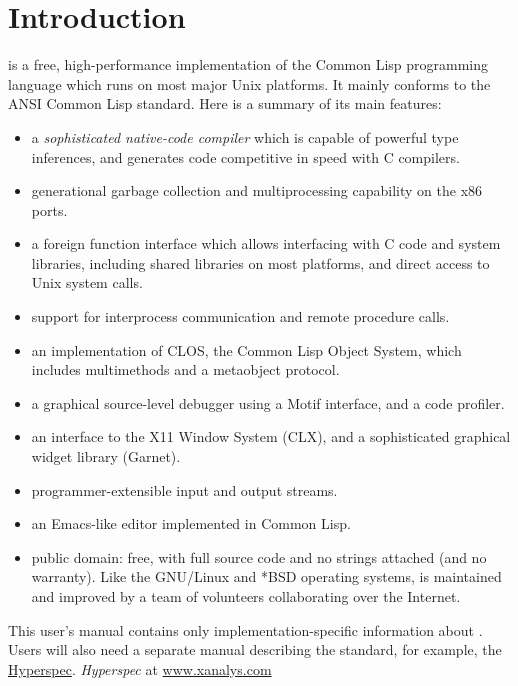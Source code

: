 \chapter{Introduction}

\cmucl{} is a free, high-performance implementation of the Common Lisp
programming language which runs on most major Unix platforms. It
mainly conforms to the ANSI Common Lisp standard. Here is a summary of
its main features:

\begin{itemize}
\item a {\em sophisticated native-code compiler} which is capable of
powerful type inferences, and generates code competitive in speed with
C compilers.

\item generational garbage collection and multiprocessing
capability on the x86 ports.

\item a foreign function interface which allows interfacing with C code and
system libraries, including shared libraries on most platforms, and
direct access to Unix system calls.

\item support for interprocess communication and remote procedure
calls.
     
\item an implementation of CLOS, the Common Lisp Object System, which
includes multimethods and a metaobject protocol.

\item a graphical source-level debugger using a Motif interface, and a
code profiler.

\item an interface to the X11 Window System (CLX), and a sophisticated
graphical widget library (Garnet).

\item programmer-extensible input and output streams.
                        
\item an Emacs-like editor implemented in Common Lisp.

\item public domain: free, with full source code and no
strings attached (and no warranty). Like the GNU/Linux and *BSD
operating systems, \cmucl{} is maintained and improved by a team of
volunteers collaborating over the Internet.
\end{itemize}


This user's manual contains only implementation-specific information
about \cmucl. Users will also need a separate manual describing the
\clisp{} standard, for example, the
\ifpdf
\href{http://www.xanalys.com/software_tools/reference/HyperSpec/FrontMatter/index-text.html}
{Hyperspec}.
\else
\emph{Hyperspec} at \href{http://www.xanalys.com/software_tools}{www.xanalys.com}
\fi


